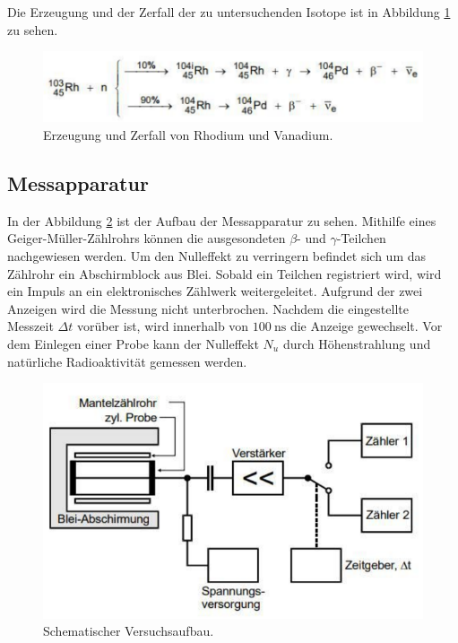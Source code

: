 Die Erzeugung und der Zerfall der zu untersuchenden Isotope ist in Abbildung \ref{fig:RhodiumVanadiumFormel} zu sehen.
\begin{figure}
    \includegraphics[width=\textwidth]{content/RhodiumVanadiumFormel.pdf}
    \caption{Erzeugung und Zerfall von Rhodium und Vanadium. \cite{anleitung}}
    \label{fig:RhodiumVanadiumFormel}
\end{figure}

\subsection{Messapparatur}
In der Abbildung \ref{fig:AufbauSkizze} ist der Aufbau der Messapparatur zu sehen.
Mithilfe eines Geiger-Müller-Zählrohrs können die ausgesondeten $\beta$- und $\gamma$-Teilchen nachgewiesen werden.
Um den Nulleffekt zu verringern befindet sich um das Zählrohr ein Abschirmblock aus Blei.
Sobald ein Teilchen registriert wird, wird ein Impuls an ein elektronisches Zählwerk weitergeleitet.
Aufgrund der zwei Anzeigen wird die Messung nicht unterbrochen.
Nachdem die eingestellte Messzeit $\Delta t $ vorüber ist, wird innerhalb von $\SI{100}{\nano\second}$ die Anzeige gewechselt.
Vor dem Einlegen einer Probe kann der Nulleffekt $N_u$ durch Höhenstrahlung und natürliche Radioaktivität gemessen werden.
\begin{figure}
    \includegraphics[width=\textwidth]{content/AufbauSkizze.pdf}
    \caption{Schematischer Versuchsaufbau.\cite{anleitung}}
    \label{fig:AufbauSkizze}
\end{figure}